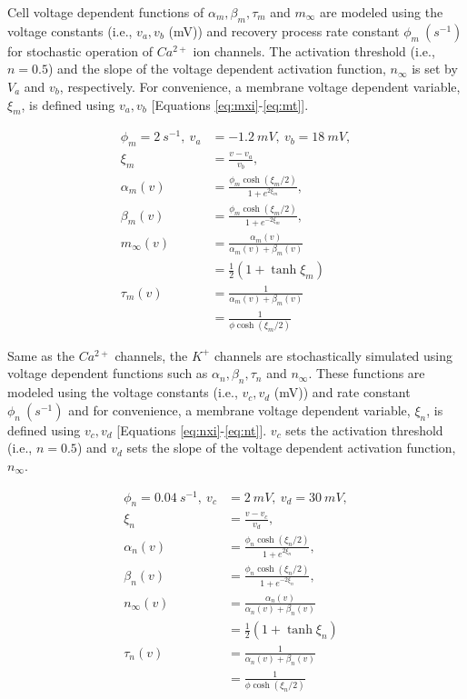 \documentclass[
]{article}
\begin{document}
Cell voltage dependent functions of \(\alpha_m, \beta_m, \tau_m\) and \(m_\infty\) are modeled using the voltage constants (i.e., \(v_a, v_b\) (mV)) and recovery process rate constant \(\phi_m\ (s^{-1})\) for stochastic operation of \(Ca^{2+}\) ion channels. The activation threshold (i.e., \(n=0.5\)) and the slope of the voltage dependent activation function, \(n_{\infty}\) is set by \(V_a\) and \(v_b\), respectively. For convenience, a membrane voltage dependent variable, \(\xi_m\), is defined using \(v_a, v_b\) {[}Equations \eqref{eq:mxi}-\eqref{eq:mt}{]}.

\begin{align}
\nonumber \phi_m = 2\ s^{-1},\  v_a &= -1.2\ mV,\ v_b = 18\ mV,
\\ \label{eq:mxi} \xi_m &= \frac{v-v_a}{v_b},
\\ \label{eq:ma} \alpha_m(v) &= \frac{\phi_m \cosh(\xi_m/2)}{1+ e^{2\xi_m}},
\\ \label{eq:mb} \beta_m(v) &= \frac{\phi_m \cosh(\xi_m/2)}{1+ e^{-2\xi_m}},
\\ \nonumber  m_\infty(v) &= \frac{\alpha_m(v)}{\alpha_m(v) + \beta_m(v)} 
\\ \label{eq:minf} &= \frac12(1 + \tanh \xi_m) 
\\ \nonumber \tau_m(v) &= \frac{1}{\alpha_m(v) + \beta_m(v)} 
\\ \label{eq:mt} &= \frac{1}{\phi \cosh(\xi_m/2)}
\end{align}

Same as the \(Ca^{2+}\) channels, the \(K^{+}\) channels are stochastically simulated using voltage dependent functions such as \(\alpha_n, \beta_n, \tau_n\) and \(n_\infty\). These functions are modeled using the voltage constants (i.e., \(v_c, v_d\) (mV)) and rate constant \(\phi_n\ (s^{-1})\) and for convenience, a membrane voltage dependent variable, \(\xi_n\), is defined using \(v_c, v_d\) {[}Equations \eqref{eq:nxi}-\eqref{eq:nt}{]}. \(v_c\) sets the activation threshold (i.e., \(n=0.5\)) and \(v_d\) sets the slope of the voltage dependent activation function, \(n_{\infty}\).

\begin{align} 
\nonumber \phi_n = 0.04\ s^{-1},\ v_c &= 2\ mV,\ v_d = 30\ mV,
\\ \label{eq:nxi} \xi_n &= \frac{v-v_c}{v_d},
\\ \label{eq:na} \alpha_n(v) &= \frac{\phi_n \cosh(\xi_n/2)}{1+ e^{2\xi_n}},
\\ \label{eq:nb} \beta_n(v) &= \frac{\phi_n \cosh(\xi_n/2)}{1+ e^{-2\xi_n}},
\\ \nonumber n_\infty(v) &= \frac{\alpha_n(v)}{\alpha_n(v) + \beta_n(v)} 
\\ \label{eq:inf} &= \frac12(1 + \tanh \xi_n) 
\\ \nonumber \tau_n(v) &= \frac{1}{\alpha_n(v) + \beta_n(v)} 
\\ \label{eq:nt} &= \frac{1}{\phi \cosh(\xi_n/2)}
\end{align}
\end{document}
